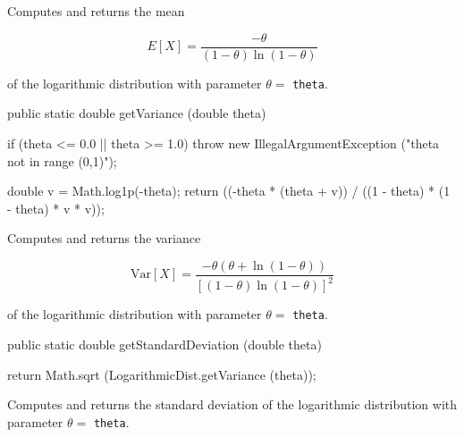 \begin{tabb}  Computes and returns the mean
\begin{latexonly}
   $$E[X] = \frac{-\theta}{(1 - \theta)\ln(1 - \theta)}$$
\end{latexonly}
   of the logarithmic distribution with parameter $\theta = $ \texttt{theta}.
\end{tabb}
\begin{htmlonly}
\end{htmlonly}
\begin{code}

   public static double getVariance (double theta)\begin{hide} {
      if (theta <= 0.0 || theta >= 1.0)
         throw new IllegalArgumentException ("theta not in range (0,1)");

      double v = Math.log1p(-theta);
      return ((-theta * (theta + v)) / ((1 - theta) * (1 - theta) * v * v));
   }\end{hide}
\end{code}
\begin{tabb}  Computes and returns the variance
\begin{latexonly}
  $$\mbox{Var}[X] = \frac{-\theta (\theta + \ln(1 - \theta))}{[(1 - \theta)
    \ln(1 - \theta)]^2}$$
\end{latexonly}
   of the logarithmic distribution with parameter $\theta =$ \texttt{theta}.
\end{tabb}
\begin{htmlonly}
\end{htmlonly}
\begin{code}

   public static double getStandardDeviation (double theta)\begin{hide} {
      return Math.sqrt (LogarithmicDist.getVariance (theta));
   }\end{hide}
\end{code}
\begin{tabb}  Computes and returns the standard deviation of the
   logarithmic distribution with parameter $\theta = $ \texttt{theta}.
\end{tabb}
\begin{htmlonly}
\end{htmlonly}
